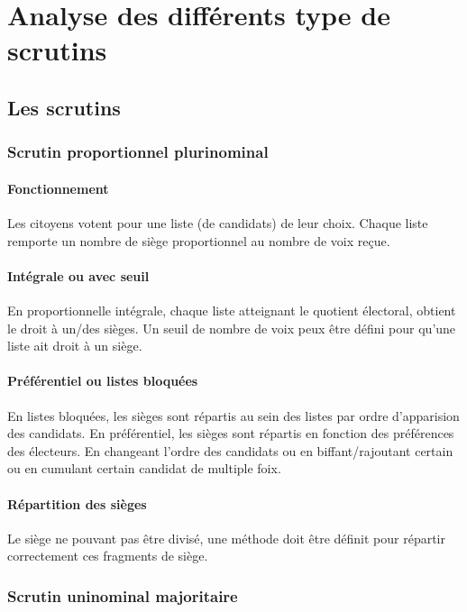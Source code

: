 \documentclass[../report]{subfiles}
\begin{document}
  \part{Analyse des différents type de scrutins}
  
  \chapter{Les scrutins}

  \section{Scrutin proportionnel plurinominal}
  
  \subsection{Fonctionnement}
  
  Les citoyens votent pour une liste (de candidats) de leur choix.
  Chaque liste remporte un nombre de siège proportionnel au nombre de voix reçue.
  \cite{noauthor_scrutin_2021}
  
  \subsection{Intégrale ou avec seuil}
  En proportionnelle intégrale, chaque liste atteignant le quotient électoral, obtient
  le droit à un/des sièges.
  Un seuil de nombre de voix peux être défini pour qu'une liste ait droit à un siège.
  
  \subsection{Préférentiel ou listes bloquées}
  En listes bloquées, les sièges sont répartis au sein des listes par ordre d'apparision 
  des candidats.
  En préférentiel, les sièges sont répartis en fonction des préférences des électeurs.
  En changeant l'ordre des candidats ou en biffant/rajoutant certain ou en cumulant certain 
  candidat de multiple foix.
  
  \subsection{Répartition des sièges}
  Le siège ne pouvant pas être divisé, une méthode doit être définit pour répartir 
  correctement ces fragments de siège.
  
  \section{Scrutin uninominal majoritaire}
  
\end{document}

